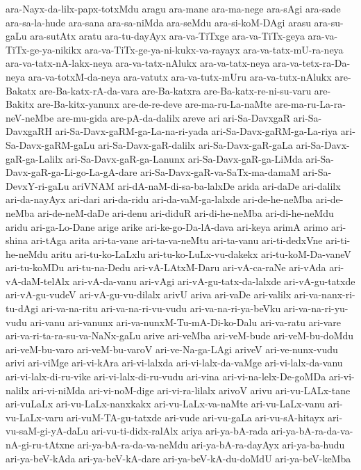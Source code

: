 {ara-Nayx-da-lilx-papx-totxMdu
aragu
ara-mane
ara-ma-nege
ara-sAgi
ara-sade
ara-sa-la-hude
ara-sana
ara-sa-niMda
ara-seMdu
ara-si-koM-DAgi
arasu
ara-su-gaLu
ara-sutAtx
aratu
ara-tu-dayAyx
ara-va-TiTxge
ara-va-TiTx-geya
ara-va-TiTx-ge-ya-nikikx
ara-va-TiTx-ge-ya-ni-kukx-va-rayayx
ara-va-tatx-mU-ra-neya
ara-va-tatx-nA-lakx-neya
ara-va-tatx-nAlukx
ara-va-tatx-neya
ara-va-tetx-ra-Da-neya
ara-va-totxM-da-neya
ara-vatutx
ara-va-tutx-mUru
ara-va-tutx-nAlukx
are-Bakatx
are-Ba-katx-rA-da-vara
are-Ba-katxra
are-Ba-katx-re-ni-su-varu
are-Bakitx
are-Ba-kitx-yanunx
are-de-re-deve
are-ma-ru-La-naMte
are-ma-ru-La-ra-neV-neMbe
are-mu-gida
are-pA-da-dalilx
areve
ari
ari-Sa-DavxgaR
ari-Sa-DavxgaRH
ari-Sa-Davx-gaRM-ga-La-na-ri-yada
ari-Sa-Davx-gaRM-ga-La-riya
ari-Sa-Davx-gaRM-gaLu
ari-Sa-Davx-gaR-dalilx
ari-Sa-Davx-gaR-gaLa
ari-Sa-Davx-gaR-ga-Lalilx
ari-Sa-Davx-gaR-ga-Lanunx
ari-Sa-Davx-gaR-ga-LiMda
ari-Sa-Davx-gaR-ga-Li-go-La-gA-dare
ari-Sa-Davx-gaR-va-SaTx-ma-damaM
ari-Sa-DevxY-ri-gaLu
ariVNAM
ari-dA-naM-di-sa-ba-lalxDe
arida
ari-daDe
ari-dalilx
ari-da-nayAyx
ari-dari
ari-da-ridu
ari-da-vaM-ga-lalxde
ari-de-he-neMba
ari-de-neMba
ari-de-neM-daDe
ari-denu
ari-diduR
ari-di-he-neMba
ari-di-he-neMdu
aridu
ari-ga-Lo-Dane
arige
arike
ari-ke-go-Da-lA-dava
ari-keya
arimA
arimo
ari-shina
ari-tAga
arita
ari-ta-vane
ari-ta-va-neMtu
ari-ta-vanu
ari-ti-dedxVne
ari-ti-he-neMdu
aritu
ari-tu-ko-LaLxlu
ari-tu-ko-LuLx-vu-dakekx
ari-tu-koM-Da-vaneV
ari-tu-koMDu
ari-tu-na-Dedu
ari-vA-LAtxM-Daru
ari-vA-ca-raNe
ari-vAda
ari-vA-daM-telAlx
ari-vA-da-vanu
ari-vAgi
ari-vA-gu-tatx-da-lalxde
ari-vA-gu-tatxde
ari-vA-gu-vudeV
ari-vA-gu-vu-dilalx
arivU
ariva
ari-vaDe
ari-valilx
ari-va-nanx-ri-tu-dAgi
ari-va-na-ritu
ari-va-na-ri-vu-vudu
ari-va-na-ri-ya-beVku
ari-va-na-ri-yu-vudu
ari-vanu
ari-vanunx
ari-va-nunxM-Tu-mA-Di-ko-Dalu
ari-va-ratu
ari-vare
ari-va-ri-ta-ra-su-va-NaNx-gaLu
arive
ari-veMba
ari-veM-bude
ari-veM-bu-doMdu
ari-veM-bu-varo
ari-veM-bu-varoV
ari-ve-Na-ga-LAgi
ariveV
ari-ve-nunx-vudu
arivi
ari-viMge
ari-vi-kAra
ari-vi-lalxda
ari-vi-lalx-da-vaMge
ari-vi-lalx-da-vanu
ari-vi-lalx-di-ru-vike
ari-vi-lalx-di-ru-vudu
ari-vina
ari-vi-na-lelx-De-goMDa
ari-vi-nalilx
ari-vi-niMda
ari-vi-noM-dige
ari-vi-ra-lilalx
arivoV
arivu
ari-vu-LALx-tane
ari-vuLaLx
ari-vu-LaLx-nanxkakx
ari-vu-LaLx-va-naMte
ari-vu-LaLx-vanu
ari-vu-LaLx-varu
ari-vuM-TA-gu-tatxde
ari-vude
ari-vu-gaLa
ari-vu-sA-hitayx
ari-vu-saM-gi-yA-daLu
ari-vu-ti-didx-ralAlx
ariya
ari-ya-bA-rada
ari-ya-bA-ra-da-va-nA-gi-ru-tAtxne
ari-ya-bA-ra-da-va-neMdu
ari-ya-bA-ra-dayAyx
ari-ya-ba-hudu
ari-ya-beV-kAda
ari-ya-beV-kA-dare
ari-ya-beV-kA-du-doMdU
ari-ya-beV-keMba
}
